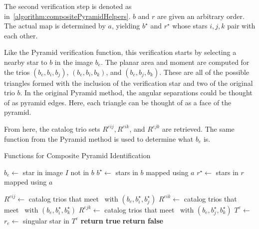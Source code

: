 The second verification step is denoted as 
in~\autoref{algorithm:compositePyramidHelpers}.
$b$ and $r$ are given an arbitrary order.
The actual map is determined by $a$, yielding $b^{\star}$ and $r^{\star}$ whose stars $i, j, k$ pair with each other.

Like the Pyramid verification function, this verification starts by selecting a nearby star to $b$ in the image $b_e$.
The planar area and moment are computed for the trios $(b_e, b_i, b_j)$, $(b_e, b_i, b_k)$, and $(b_e, b_j, b_k)$.
These are all of the possible triangles formed with the inclusion of the verification star and two of the original
trio $b$.
In the original Pyramid method, the angular separations could be thought of as pyramid edges.
Here, each triangle can be thought of as a face of the pyramid.

From here, the catalog trio sets $R^{eij}, R^{eik}$, and $R^{ejk}$ are retrieved.
The same function  from the Pyramid method is used to determine what $b_e$ is.
\begin{algorithm} 
    \caption{Functions for Composite Pyramid Identification} \label{algorithm:compositePyramidHelpers}
    \begin{algorithmic}[1]
        \State $b_e \gets $ star in image $I$ not in $b$
        \State $b^{\star} \gets $ stars in $b$ mapped using $a$
        \State $r^{\star} \gets $ stars in $r$ mapped using $a$

        \State $R^{eij} \gets $ catalog trios that meet~ with $(b_e, b^{\star}_i,
        b^{\star}_j)$
        \State $R^{eik} \gets $ catalog trios that meet~ with $(b_e, b^{\star}_i,
        b^{\star}_k)$
        \State $R^{ejk} \gets $ catalog trios that meet~ with $(b_e, b^{\star}_j,
        b^{\star}_k)$
        \State $T^e \gets $ 
        \\
        \State $r_e \gets $ singular star in $T^e$
        \State \textbf{return true}
        \EndIf
        \EndIf
        \State \textbf{return false}
        \EndFunction
    \end{algorithmic}
\end{algorithm}

\begin{table*}[ht]
\end{table*}
